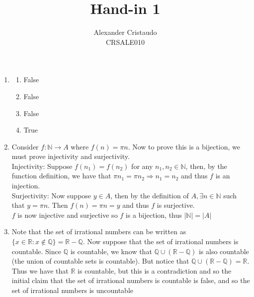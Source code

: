 \documentclass[11pt, oneside]{article}   	%
\title{Hand-in 1}
\author{Alexander Cristaudo \\ CRSALE010}
\date{}							%
\begin{document}
\maketitle

\begin{enumerate}
\item[1.] {
\begin{enumerate}
\item[(a)] {False}
\item[(b)] {False}
\item[(c)] {False}
\item[(d)] {True}
\end{enumerate}
}
\item[    2. ] {Consider $f: \mathbb{N} \to A$ where $f(n) = \pi n$. Now to prove this is a bijection, we must prove injectivity and surjectivity. \\ Injectivity: Suppose $f(n_1) = f(n_2)$ for any $n_1,n_2 \in \mathbb{N}$, then, by the function definition, we have that $\pi n_1 = \pi n_2 \Rightarrow n_1 = n_2$ and thus $f$ is an injection. \\ Surjectivity: Now suppose $y \in A$, then by the definition of $A, \exists n \in \mathbb{N}$ such that $y = \pi n$. Then $f(n) = \pi n = y$ and thus $f$ is surjective. \\ $f$ is now injective and surjective so $f$ is a bijection, thus $|\mathbb{N}| = |A|$}

\item[3.] {Note that the set of irrational numbers can be written as $\{x \in \mathbb{R} : x \notin \mathbb{Q}\} = \mathbb{R}-\mathbb{Q}$. Now suppose that the set of irrational numbers is countable. Since $\mathbb{Q}$ is countable, we know that $\mathbb{Q} \cup (\mathbb{R} - \mathbb{Q})$ is also countable (the union of countable sets is countable). But notice that $\mathbb{Q} \cup (\mathbb{R} - \mathbb{Q}) = \mathbb{R}$. Thus we have that $\mathbb{R}$ is countable, but this is a contradiction and so the initial claim that the set of irrational numbers is countable is false, and so the set of irrational numbers is uncountable
}


\end{enumerate}
\end{document}
